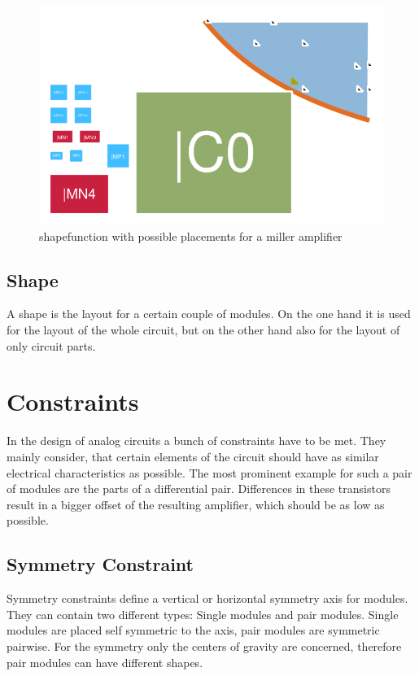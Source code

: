 \begin{figure}
	\centering
	\includegraphics[scale=1.8]{FIG/shapefunction.png}
	\caption{shapefunction with possible placements for a miller amplifier}
	\label{fig:shapefunction}
\end{figure}

\subsection{Shape}
A shape is the layout for a certain couple of modules. On the one hand it is used for the layout of the whole circuit, but on the other hand also for the layout of only circuit parts.

\section{Constraints}
In the design of analog circuits a bunch of constraints have to be met. They mainly consider, that certain elements of the circuit should have as similar electrical characteristics as possible. The most prominent example for such a pair of modules are the parts of a differential pair. Differences in these transistors result in a bigger offset of the resulting amplifier, which should be as low as possible.

\subsection{Symmetry Constraint}
Symmetry constraints define a vertical or horizontal symmetry axis for modules. They can contain two different types: Single modules and pair modules. Single modules are placed self symmetric to the axis, pair modules are symmetric pairwise. For the symmetry only the centers of gravity are concerned, therefore pair modules can have different shapes. 

